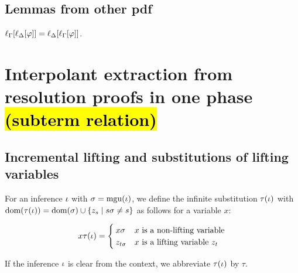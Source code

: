 \documentclass[,%
	draft=false,%
	numbers=noendperiod
	11pt,
	a4paper,
	oneside,%
	openany,
]{memoir}
\begin{document}
\tableofcontents

\section{Lemmas from other pdf}
\begin{lemma}
	\label{lemma:lifting_order_not_relevant}
	$\ell_{\Gamma}[\ell_{\Delta}[\varphi]] = \ell_{\Delta}[\ell_{\Gamma}[\varphi]]$.
\end{lemma}

\clearpage

\chapter{Interpolant extraction from resolution proofs in one phase \hl{(subterm relation)}}

\section{Incremental lifting and substitutions of lifting variables}

\begin{defi}
	For an inference $\iota$ with $\sigma = \operatorname{mgu}(\iota)$, we define the infinite substitution $\tau(\iota)$ with $\operatorname{dom}(\tau(\iota)) = \operatorname{dom}(\sigma) \cup \{z_s \mid s\sigma \neq s\}$ as follows for a variable $x$:

	\[
		x\tau(\iota) =
		\begin{cases}
			x\sigma & \text{$x$ is a non-lifting variable} \\
			z_{t\sigma} & \text{$x$ is a lifting variable $z_t$}
		\end{cases} 
	\]

	If the inference $\iota$ is clear from the context, we abbreviate $\tau(\iota)$ by $\tau$. 
\end{defi}
\end{document}
